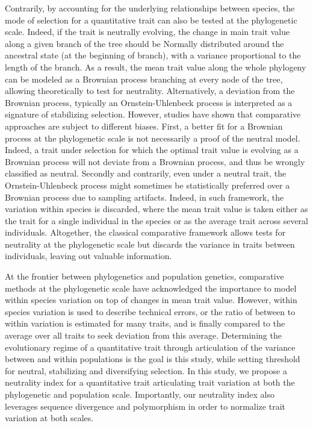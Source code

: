 \documentclass{article}
\begin{document}
Contrarily, by accounting for the underlying relationships between species, the mode of selection for a quantitative trait can also be tested at the phylogenetic scale\cite{felsenstein_phylogenies_1985}.
Indeed, if the trait is neutrally evolving, the change in main trait value along a given branch of the tree should be Normally distributed around the ancestral state (at the beginning of branch), with a variance proportional to the length of the branch\cite{hansen_translating_1996}.
As a result, the mean trait value along the whole phylogeny can be modeled as a Brownian process branching at every node of the tree, allowing theoretically to test for neutrality\cite{hansen_translating_1996, harmon_phylogenetic_2018}.
Alternatively, a deviation from the Brownian process, typically an Ornstein-Uhlenbeck process is interpreted as a signature of stabilizing selection\cite{catalan_drift_2019}.
However, studies have shown that comparative approaches are subject to different biases\cite{harmon_phylogenetic_2018}.
First, a better fit for a Brownian process at the phylogenetic scale is not necessarily a proof of the neutral model.
Indeed, a trait under selection for which the optimal trait value is evolving as a Brownian process will not deviate from a Brownian process, and thus be wrongly classified as neutral\cite{hansen_translating_1996}.
Secondly and contrarily, even under a neutral trait, the Ornstein-Uhlenbeck process might sometimes be statistically preferred over a Brownian process due to sampling artifacts\cite{silvestro_measurement_2015, cooper_cautionary_2016, price_detecting_2022}.
Indeed, in such framework, the variation within species is discarded, where the mean trait value is taken either as the trait for a single individual in the species or as the average trait across several individuals.
Altogether, the classical comparative framework allows tests for neutrality at the phylogenetic scale but discards the variance in traits between individuals, leaving out valuable information.

At the frontier between phylogenetics and population genetics, comparative methods at the phylogenetic scale have acknowledged the importance to model within species variation on top of changes in mean trait value\cite{fay_evaluating_2008, kostikova_bridging_2016, gaboriau_multiplatform_2020}.
However, within species variation is used to describe technical errors, or the ratio of between to within variation is estimated for many traits, and is finally compared to the average over all traits to seek deviation from this average\cite{rohlfs_modeling_2014, rohlfs_phylogenetic_2015}.
Determining the evolutionary regime of a quantitative trait through articulation of the variance between and within populations is the goal is this study, while setting threshold for neutral, stabilizing and diversifying selection.
In this study, we propose a neutrality index for a quantitative trait articulating trait variation at both the phylogenetic and population scale.
Importantly, our neutrality index also leverages sequence divergence and polymorphism in order to normalize trait variation at both scales.
\end{document}
